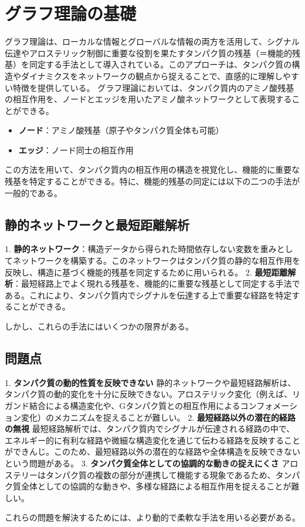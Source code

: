 \documentclass{article}
\begin{document}
\section*{グラフ理論の基礎}

グラフ理論は、ローカルな情報とグローバルな情報の両方を活用して、シグナル伝達やアロステリック制御に重要な役割を果たすタンパク質の残基（＝機能的残基）を同定する手法として導入されている。このアプローチは、タンパク質の構造やダイナミクスをネットワークの観点から捉えることで、直感的に理解しやすい特徴を提供している。
グラフ理論においては、タンパク質内のアミノ酸残基の相互作用を、ノードとエッジを用いたアミノ酸ネットワークとして表現することができる。

\begin{itemize}
    \item \textbf{ノード}：アミノ酸残基（原子やタンパク質全体も可能）
    \item \textbf{エッジ}：ノード同士の相互作用
\end{itemize}

この方法を用いて、タンパク質内の相互作用の構造を視覚化し、機能的に重要な残基を特定することができる。特に、機能的残基の同定には以下の二つの手法が一般的である。

\subsection*{静的ネットワークと最短距離解析}

1. \textbf{静的ネットワーク}：構造データから得られた時間依存しない変数を重みとしてネットワークを構築する。このネットワークはタンパク質の静的な相互作用を反映し、構造に基づく機能的残基を同定するために用いられる。
2. \textbf{最短距離解析}：最短経路上でよく現れる残基を、機能的に重要な残基として同定する手法である。これにより、タンパク質内でシグナルを伝達する上で重要な経路を特定することができる。

しかし、これらの手法にはいくつかの限界がある。

\subsection*{問題点}

1. \textbf{タンパク質の動的性質を反映できない}  
   静的ネットワークや最短経路解析は、タンパク質の動的変化を十分に反映できない。アロステリック変化（例えば、リガンド結合による構造変化や、Gタンパク質との相互作用によるコンフォメーション変化）のメカニズムを捉えることが難しい。
2. \textbf{最短経路以外の潜在的経路の無視}  
   最短経路解析では、タンパク質内でシグナルが伝達される経路の中で、エネルギー的に有利な経路や微細な構造変化を通じて伝わる経路を反映することができんじ。このため、最短経路以外の潜在的な経路や全体構造を反映できないという問題がある。
3. \textbf{タンパク質全体としての協調的な動きの捉えにくさ}  
   アロステリーはタンパク質の複数の部分が連携して機能する現象であるため、タンパク質全体としての協調的な動きや、多様な経路による相互作用を捉えることが難しい。

これらの問題を解決するためには、より動的で柔軟な手法を用いる必要がある。
\end{document}
